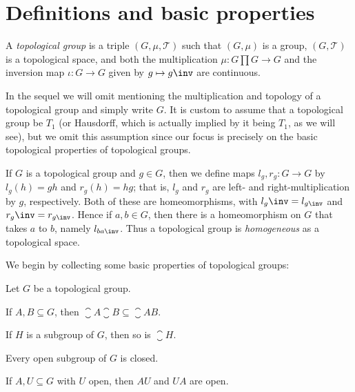 \documentclass[article, a4paper, 11pt, oneside]{memoir}
\title{\doctitle}
\author{\docauthor}
\numberwithin{equation}{chapter}
\newcommand{\calT}{\mathcal{T}}
\begin{document}
\maketitle

\chapter{Definitions and basic properties}

\begin{definition}
    \label{def:topological_group}
    A \emph{topological group} is a triple $(G, \mu, \calT)$ such that $(G, \mu)$ is a group, $(G, \calT)$ is a topological space, and both the multiplication $\mu \colon G \prod G \to G$ and the inversion map $\iota \colon G \to G$ given by $g \mapsto g\inv$ are continuous.
\end{definition}
%
In the sequel we will omit mentioning the multiplication and topology of a topological group and simply write $G$. It is custom to assume that a topological group be $T_1$ (or Hausdorff, which is actually implied by it being $T_1$, as we will see), but we omit this assumption since our focus is precisely on the basic topological properties of topological groups.

If $G$ is a topological group and $g \in G$, then we define maps $l_g, r_g \colon G \to G$ by $l_g(h) = gh$ and $r_g(h) = hg$; that is, $l_g$ and $r_g$ are left- and right-multiplication by $g$, respectively. Both of these are homeomorphisms, with $l_g\inv = l_{g\inv}$ and $r_g\inv = r_{g\inv}$. Hence if $a, b \in G$, then there is a homeomorphism on $G$ that takes $a$ to $b$, namely $l_{ba\inv}$. Thus a topological group is \emph{homogeneous} as a topological space.

We begin by collecting some basic properties of topological groups:

\begin{proposition}
    Let $G$ be a topological group.
    \begin{enumprop}
        \item \label{enum:closure_of_product} If $A,B \subseteq G$, then $\closure{A} \closure{B} \subseteq \closure{AB}$.
        \item \label{enum:closure_of_subgroup} If $H$ is a subgroup of $G$, then so is $\closure{H}$.
        \item \label{enum:open_subgroup_is_closed} Every open subgroup of $G$ is closed.
        \item \label{enum:product_open_set} If $A,U \subseteq G$ with $U$ open, then $AU$ and $UA$ are open.
    \end{enumprop}
\end{proposition}
\end{document}
